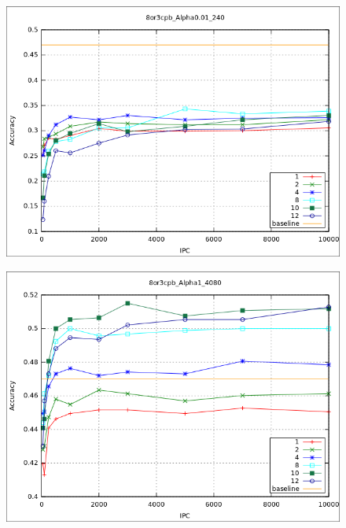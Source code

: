 			\begin{figure}[htbp]
				\centering
				\includegraphics[scale=0.6]{img/resultados/sinteticas/worst_median_8or3cpb_Alpha0,01_240.png}
				\caption[Sintéticas mediana peor resultado]{}
				\label{fig: Sinteticas-median-bajo}
			\end{figure}
				
			\begin{figure}[htbp]
				\centering
				\includegraphics[scale=0.6]{img/resultados/sinteticas/best_expon_8or3cpb_Alpha1_4080.png}
				\caption[Sintéticas exponencial mejor resultado]{}
				\label{fig: Sinteticas-expon-mejor}
			\end{figure}
	
